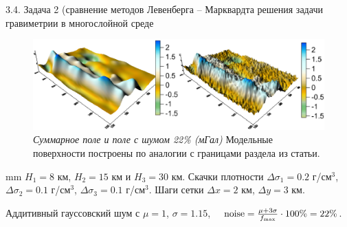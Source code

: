 \documentclass[10pt,pdf, mathserif, hyperref={unicode}]{beamer}
\begin{document}
\begin{frame}{3.4. Задача 2 \small (сравнение методов Левенберга -- Марквардта решения задачи гравиметрии в многослойной среде}
	\begin{figure}
		\centering
		\includegraphics[height=0.3\textheight]{fields}\\
		\centering\textit{Суммарное поле и поле с шумом 22\% (мГал)}
\flushleft
\vskip -5pt
Модельные поверхности построены по аналогии с границами раздела из статьи.
%		
	\end{figure}
%	
	 mm
	$H_1=8$ км, $H_2=15$ км и $H_3=30$ км. Скачки плотности $\Delta\sigma_1=0.2$ г/см$^3$, $\Delta\sigma_2=0.1$ г/см$^3$, $\Delta\sigma_3=0.1$ г/см$^3$. Шаги сетки $\Delta x=2$ км, $\Delta y=3$ км.
	
	Аддитивный гауссовский шум с $\mu=1$, $\sigma=1.15$, $\quad\textnormal{noise}=\frac{\mu+3\sigma}{f_{\textnormal{max}}}\cdot 100\%=22\%$.

	\let\thefootnote\relax\let\thefootnote\relax{}
\end{frame}
\end{document}
